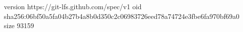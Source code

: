 version https://git-lfs.github.com/spec/v1
oid sha256:06bf50a5fa04b27b4a8b0d350c2c06983726eed78a74724e3fbe6fa970bf69a0
size 93159
